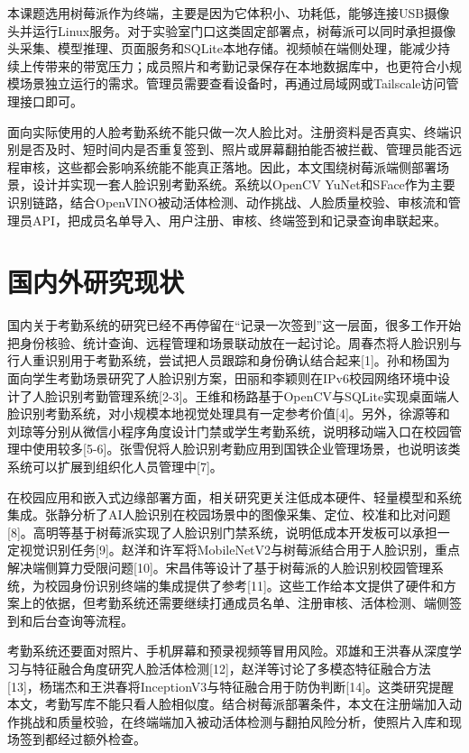 \documentclass[UTF8]{heuthesis}
\begin{document}
本课题选用树莓派作为终端，主要是因为它体积小、功耗低，能够连接USB摄像头并运行Linux服务。对于实验室门口这类固定部署点，树莓派可以同时承担摄像头采集、模型推理、页面服务和SQLite本地存储。视频帧在端侧处理，能减少持续上传带来的带宽压力；成员照片和考勤记录保存在本地数据库中，也更符合小规模场景独立运行的需求。管理员需要查看设备时，再通过局域网或Tailscale访问管理接口即可。

面向实际使用的人脸考勤系统不能只做一次人脸比对。注册资料是否真实、终端识别是否及时、短时间内是否重复签到、照片或屏幕翻拍能否被拦截、管理员能否远程审核，这些都会影响系统能不能真正落地。因此，本文围绕树莓派端侧部署场景，设计并实现一套人脸识别考勤系统。系统以OpenCV YuNet和SFace作为主要识别链路，结合OpenVINO被动活体检测、动作挑战、人脸质量校验、审核流和管理员API，把成员名单导入、用户注册、审核、终端签到和记录查询串联起来。

\section{国内外研究现状}
国内关于考勤系统的研究已经不再停留在“记录一次签到”这一层面，很多工作开始把身份核验、统计查询、远程管理和场景联动放在一起讨论。周春杰将人脸识别与行人重识别用于考勤系统，尝试把人员跟踪和身份确认结合起来[1]。孙和杨国为面向学生考勤场景研究了人脸识别方案，田丽和李颖则在IPv6校园网络环境中设计了人脸识别考勤管理系统[2-3]。王维和杨路基于OpenCV与SQLite实现桌面端人脸识别考勤系统，对小规模本地视觉处理具有一定参考价值[4]。另外，徐源等和刘琼等分别从微信小程序角度设计门禁或学生考勤系统，说明移动端入口在校园管理中使用较多[5-6]。张雪倪将人脸识别考勤应用到国铁企业管理场景，也说明该类系统可以扩展到组织化人员管理中[7]。

在校园应用和嵌入式边缘部署方面，相关研究更关注低成本硬件、轻量模型和系统集成。张静分析了AI人脸识别在校园场景中的图像采集、定位、校准和比对问题[8]。高明等基于树莓派实现了人脸识别门禁系统，说明低成本开发板可以承担一定视觉识别任务[9]。赵洋和许军将MobileNetV2与树莓派结合用于人脸识别，重点解决端侧算力受限问题[10]。宋昌伟等设计了基于树莓派的人脸识别校园管理系统，为校园身份识别终端的集成提供了参考[11]。这些工作给本文提供了硬件和方案上的依据，但考勤系统还需要继续打通成员名单、注册审核、活体检测、端侧签到和后台查询等流程。

考勤系统还要面对照片、手机屏幕和预录视频等冒用风险。邓雄和王洪春从深度学习与特征融合角度研究人脸活体检测[12]，赵洋等讨论了多模态特征融合方法[13]，杨瑞杰和王洪春将InceptionV3与特征融合用于防伪判断[14]。这类研究提醒本文，考勤写库不能只看人脸相似度。结合树莓派部署条件，本文在注册端加入动作挑战和质量校验，在终端端加入被动活体检测与翻拍风险分析，使照片入库和现场签到都经过额外检查。
\end{document}
